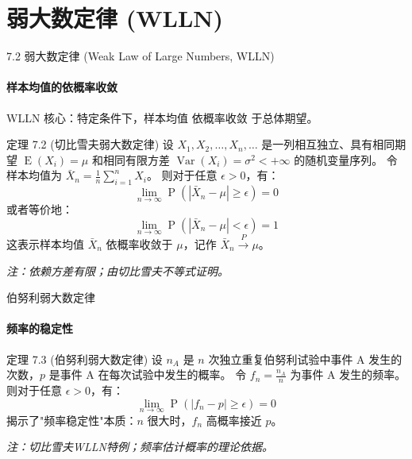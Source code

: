 \documentclass[UTF8]{beamer}
\DeclareMathOperator{\E}{\operatorname{E}}
\DeclareMathOperator{\Var}{\operatorname{Var}}
\DeclareMathOperator{\Prob}{\operatorname{P}}
\begin{document}
\section{弱大数定律 (WLLN)}
\begin{frame}[shrink=5]{7.2 弱大数定律 (Weak Law of Large Numbers, WLLN)}
    \framesubtitle{样本均值的依概率收敛}
    WLLN 核心：特定条件下，样本均值 \alert{依概率收敛} 于总体期望。
    \vspace{0.3cm}

    \begin{block}{定理 7.2 (切比雪夫弱大数定律)}
        设 $X_1, X_2, \dots, X_n, \dots$ 是一列\alert{相互独立}、具有相同期望 $\E(X_i) = \mu$ 和相同\alert{有限方差} $\Var(X_i) = \sigma^2 < +\infty$ 的随机变量序列。
        令样本均值为 $\bar{X}_n = \frac{1}{n} \sum_{i=1}^{n} X_i$。
        则对于任意 $\epsilon > 0$，有：
        \[ \lim_{n \to \infty} \Prob(|\bar{X}_n - \mu| \geq \epsilon) = 0 \]
        或者等价地：
        \[ \lim_{n \to \infty} \Prob(|\bar{X}_n - \mu| < \epsilon) = 1 \]
        这表示样本均值 $\bar{X}_n$ \alert{依概率收敛}于 $\mu$，记作 $\bar{X}_n \xrightarrow{P} \mu$。
    \end{block}
    \vspace{0.3cm}
    \footnotesize
    \textit{注：依赖方差有限；由切比雪夫不等式证明。}
\end{frame}

\begin{frame}{伯努利弱大数定律}
    \framesubtitle{频率的稳定性}
    \begin{block}{定理 7.3 (伯努利弱大数定律)}
        设 $n_A$ 是 $n$ 次独立重复伯努利试验中事件 A 发生的次数，$p$ 是事件 A 在每次试验中发生的概率。
        令 $f_n = \frac{n_A}{n}$ 为事件 A 发生的频率。
        则对于任意 $\epsilon > 0$，有：
        \[ \lim_{n \to \infty} \Prob\left(\left| f_n - p \right| \geq \epsilon\right) = 0 \]
        揭示了"\alert{频率稳定性}"本质：$n$ 很大时，$f_n$ 高概率接近 $p$。
    \end{block}
    \vspace{0.3cm}
    \footnotesize
    \textit{注：切比雪夫WLLN特例；频率估计概率的理论依据。}
\end{frame}
\end{document}
